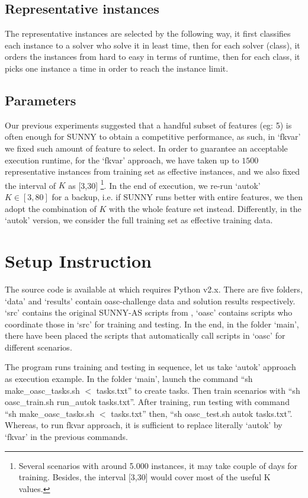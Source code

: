 \documentclass[tablecaption=bottom,wcp]{jmlr} %
\begin{document}
\subsection{Representative instances}
The representative instances are selected by the following way, it first classifies each instance to a solver who solve it in least time, then for each solver (class), it orders the instances from hard to easy in terms of runtime, then for each class, it picks one instance a time in order to reach the instance limit. 

\subsection{Parameters}
Our previous experiments \cite{DBLP:conf/cilc/AmadiniBGLM15} suggested that a handful subset of features (eg: 5) is often enough for SUNNY to obtain a competitive performance, as such, in `fkvar' we fixed such amount of feature to select. In order to guarantee an acceptable execution runtime, for the `fkvar' approach, we have taken up to $1500$ representative instances from training set as effective instances, and we also fixed the interval of $K$ as [3,30] \footnote{Several scenarios with around 5.000 instances, it may take couple of days for training. Besides, the interval [3,30] would cover most of the useful K values. }.  In the end of execution, we re-run `autok' $K \in [3,80]$ for a backup, i.e. if SUNNY runs better with entire features, we then adopt the combination of $K$ with the whole feature set instead. Differently, in the `autok' version, we consider the full training set as effective training data.

\section{Setup Instruction}

The source code is available at \cite{sunnyoasc} which requires Python v2.x. There are five folders, `data' and `results' contain oasc-challenge data and solution results respectively. `src' contains the original SUNNY-AS scripts from \cite{sunnyas}, `oasc' contains scripts who coordinate those in `src' for training and testing. In the end, in the folder `main', there have been placed the scripts that automatically call scripts in `oasc' for different scenarios. 

The program runs training and testing in sequence, let us take `autok' approach as execution example. In the folder `main', launch the command ``sh make\_oasc\_tasks.sh $<$ tasks.txt'' to create tasks. Then train scenarios with ``sh oasc\_train.sh run\_autok tasks.txt''. After training, run testing with command ``sh make\_oasc\_tasks.sh $<$ tasks.txt'' then, ``sh oasc\_test.sh autok tasks.txt''. Whereas, to run fkvar approach, it is sufficient to replace literally `autok' by `fkvar' in the previous commands. 



\appendix
\end{document}
